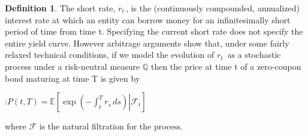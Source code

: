 \documentclass[10pt, oneside, reqno]{amsbook}
\theoremstyle{plain}%
\theoremstyle{definition}
\theoremstyle{rem}
\theoremstyle{definition}
\newtheorem{dfn}[thm]{Definition}
\def\Qbb{\ensuremath{\mathbb{Q}}}
\numberwithin{equation}{chapter}
\begin{document}
\begin{dfn}
The short rate, $r_t \,$, is the (continuously compounded, annualized) interest rate at 
which an entity can borrow money for an infinitesimally short period of time from time t. 
Specifying the current short rate does not specify the entire yield curve. However
 arbitrage arguments show that, under some fairly relaxed technical conditions, 
if we model the evolution of $r_t \,$ as a stochastic process under a risk-neutral measure $\Qbb$ 
then the price at time t of a zero-coupon bond maturing at time T is given by

:$ P(t,T) = \mathbb{E}\left[\left. \exp{\left(-\int_t^T r_s\, ds\right) } \right| \mathcal{F}_t \right] $

where $\mathcal{F}$ is the natural filtration for the process.

\end{dfn}
\end{document}
